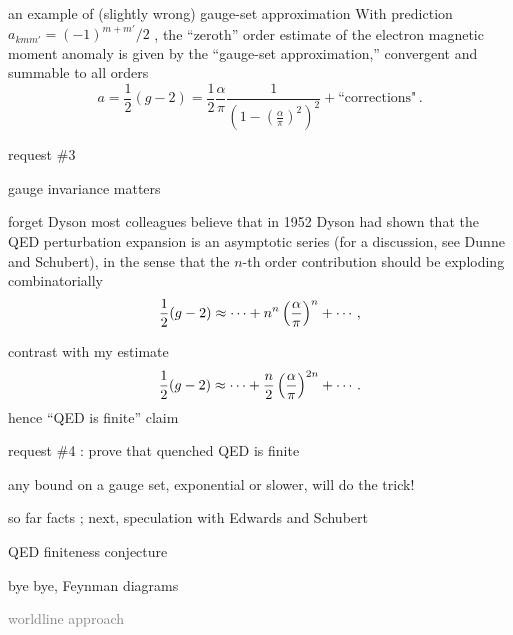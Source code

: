 \begin{frame}{an example of (slightly wrong) gauge-set approximation}
With prediction \(
a_{kmm'} = (-1)^{m+m'}\!/2
\) %
, the ``zeroth'' order estimate of the electron
magnetic moment anomaly is given by the ``gauge-set
approximation,'' convergent and summable to all orders
\[ %
a=\frac{1}{2}(g-2) =  \frac{1}{2} \frac{\alpha}{\pi}
                     \frac{1}
           {\left( 1 - \left(\frac{\alpha}{\pi}\right)^2
			\right)^2
		      } + \mbox{``corrections"}
\,.
\] %
\end{frame}

\begin{frame}{request \#3}
\begin{center}
{\huge gauge invariance matters}
\end{center}
\end{frame}


\begin{frame}{forget Dyson}
most
colleagues believe that in 1952 Dyson had  shown that the
QED perturbation expansion is an asymptotic series (for a discussion, see
Dunne and Schubert), in the sense that the $n$-th order
contribution should be exploding combinatorially
$$
{1 \over 2} (g-2) \approx
\cdots + n^n \left(\frac{\alpha}{\pi}\right)^n + \cdots
\,,
$$

contrast with my estimate
\[
{1 \over 2} (g-2) \approx
\cdots + \frac{n}{2}\left(\frac{\alpha}{\pi}\right)^{2n} + \cdots
\,.
\]
hence ``QED is finite'' claim
\end{frame}

\begin{frame}{request \#4 : prove that quenched QED is finite}
\begin{center}
{\huge any bound on a gauge set, exponential or slower, will do the trick!}
\end{center}
\end{frame}

\begin{frame}{so far facts ; next, speculation with Edwards and Schubert}
\begin{enumerate}
              \item
QED finiteness conjecture
              \item {\Large
bye bye, Feynman diagrams
                  }\textcolor{gray}{\small
              \item
worldline approach
                    }
\end{enumerate}
\end{frame}


